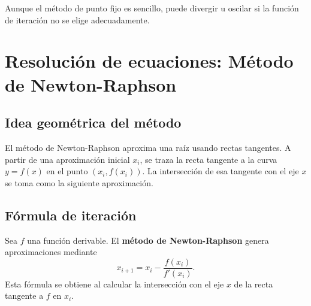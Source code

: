 \documentclass[a4,11pt]{aleph-notas}
\begin{document}
\begin{advertencia}
    Aunque el método de punto fijo es sencillo, puede divergir u oscilar si la función de iteración no se elige adecuadamente.
\end{advertencia}

\section{Resolución de ecuaciones: Método de Newton-Raphson}

\subsection{Idea geométrica del método}

El método de Newton-Raphson aproxima una raíz usando rectas tangentes. A partir de una aproximación inicial $x_i$, se traza la recta tangente a la curva $y=f(x)$ en el punto $(x_i,f(x_i))$. La intersección de esa tangente con el eje $x$ se toma como la siguiente aproximación.

\subsection{Fórmula de iteración}

\begin{defi}
    Sea $f$ una función derivable. El \textbf{método de Newton-Raphson} genera aproximaciones mediante
    \[
        x_{i+1}=x_i-\frac{f(x_i)}{f'(x_i)}.
    \]
    Esta fórmula se obtiene al calcular la intersección con el eje $x$ de la recta tangente a $f$ en $x_i$.
\end{defi}

\begin{pscodigo}
\begin{function}[H]
\end{function}
\end{pscodigo}
\end{document}
